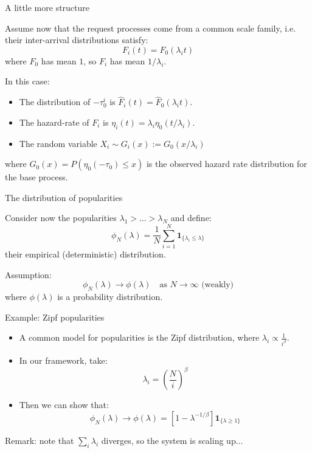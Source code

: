 \documentclass[aspectratio=169]{beamer}
\newcommand{\ind}[1]{\mathbf{1}_{#1}}
\newenvironment*{myitem}[1][1.5em]{\begin{itemize}\setlength{\itemsep}{#1}}{\end{itemize}}
\begin{document}
\begin{frame}{A little more structure}
	
	Assume now that the request processes come from a common scale family, i.e. their inter-arrival distributions satisfy:
	\begin{equation*}
		F_i(t) = F_0(\lambda_i t)
	\end{equation*}
	where $F_0$ has mean $1$, so $F_i$ has mean $1/\lambda_i$.

	\pause \vfill

	In this case:
	\begin{myitem}[1em]
		\item The distribution of $-\tau_0^i$ is $\hat{F}_i(t) = \hat{F}_0(\lambda_i t)$.
		\item The hazard-rate of $F_i$ is $\eta_i(t) = \lambda_i \eta_0(t/\lambda_i)$.
		\item The random variable $X_i\sim G_i(x):=G_0(x/\lambda_i)$
	\end{myitem}
	\vfill
	where $G_0(x) = P(\eta_0(-\tau_0)\leqslant x)$ is the observed hazard rate distribution for the base process.

\end{frame}

\begin{frame}{The distribution of popularities}
	
	Consider now the popularities $\lambda_1> \ldots > \lambda_N$ and define:
	\begin{equation*}
		\phi_N(\lambda) = \frac{1}{N}\sum_{i=1}^N \ind{\{\lambda_i\leqslant \lambda\}}
	\end{equation*}
	their empirical (deterministic) distribution.

	\pause \vfill
	\alert{Assumption:}
	\begin{equation*}
		\phi_N(\lambda) \to \phi(\lambda) \quad \text{as } N\to\infty \text{ (weakly)}
	\end{equation*}
	where $\phi(\lambda)$ is a probability distribution.
\end{frame}

\begin{frame}{Example: Zipf popularities}
	
	\begin{myitem}
		\item A common model for popularities is the \alert{Zipf} distribution, where $\lambda_i \propto \frac{1}{i^\beta}$.
		\item In our framework, take:
			\begin{equation*}
				\lambda_i = \left(\frac{N}{i}\right)^\beta
			\end{equation*}
		\item Then we can show that:
		    \begin{equation*}
				\phi_N(\lambda) \to \phi(\lambda) = \left[1-\lambda^{-1/\beta}\right]\ind{\{\lambda\geqslant1\}}
			\end{equation*}
	\end{myitem}

	\vfill

	\alert{Remark:} note that $\sum_i \lambda_i$ diverges, so the system is scaling up...
\end{frame}
\end{document}

